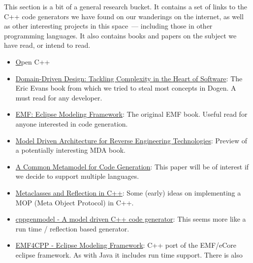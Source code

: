 \documentclass{book}
\begin{document}
This section is a bit of a general research bucket. It contains a set
of links to the C++ code generators we have found on our wanderings on
the internet, as well as other interesting projects in this space~---
including those in other programming languages. It also contains books
and papers on the subject we have read, or intend to read.

\begin{itemize}
  \item \href{http://www.csg.ci.i.u-tokyo.ac.jp/~chiba/opencxx/html/index.html} Open C++
  \item
  \href{http://www.amazon.co.uk/Domain-Driven-Design-Tackling-Complexity-ebook/dp/B00794TAUG/ref\%3Dsr_1_2?ie\%3DUTF8&qid\%3D1368380797&sr\%3D8-2&keywords\%3Dmodel\%2Bdriven\%2Bdesign}{Domain-Driven
    Design: Tackling Complexity in the Heart of Software}: The Eric
  Evans book from which we tried to steal most concepts in Dogen. A
  must read for any developer.
\item
  \href{http://www.amazon.co.uk/EMF-Eclipse-Modeling-Framework-ebook/dp/B0013TPYVW/ref\%3Dsr_1_2?s\%3Dbooks&ie\%3DUTF8&qid\%3D1368380262&sr\%3D1-2&keywords\%3DEclipse\%2BModeling\%2BFramework\%2B\%255BPaperback\%255D}{EMF:
    Eclipse Modeling Framework}: The original EMF book. Useful read
  for anyone interested in code generation.
\item
  \href{http://www.scribd.com/doc/78264699/Model-Driven-Architecture-for-Reverse-Engineering-Technologies-Strategic-Directions-and-System-Evolution-Premier-Reference-Source}{Model
    Driven Architecture for Reverse Engineering Technologies}: Preview
  of a potentially interesting MDA book.
\item
  \href{http://www2.informatik.hu-berlin.de/~piefel/Documents/06CITSA-CMMCG.pdf}{A
    Common Metamodel for Code Generation}: This paper will be of
  interest if we decide to support multiple languages.
\item
  \href{http://www.vollmann.com/pubs/meta/meta/meta.html}{Metaclasses
    and Reflection in C++}: Some (early) ideas on implementing a MOP
  (Meta Object Protocol) in C++.
\item
  \href{https://code.google.com/a/eclipselabs.org/p/cppgenmodel/}{cppgenmodel
    - A model driven C++ code generator}: This seems more like a run
  time / reflection based generator.
\item \href{https://code.google.com/p/emf4cpp/}{EMF4CPP - Eclipse
  Modeling Framework}: C++ port of the EMF/eCore eclipse framework. As
  with Java it includes run time support. There is also

\end{itemize}
\end{document}
